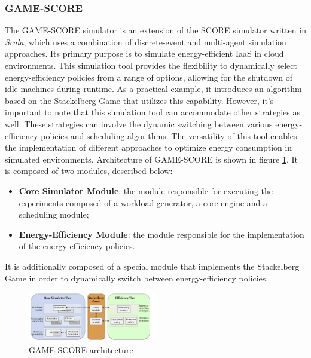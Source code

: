 {\subsubsection*{GAME-SCORE}
The GAME-SCORE simulator \cite{fernandez2019game} is an extension of the SCORE simulator written in \emph{Scala}, which uses a combination of discrete-event and multi-agent simulation approaches. Its primary purpose is to simulate energy-efficient IaaS in cloud environments. This simulation tool provides the flexibility to dynamically select energy-efficiency policies from a range of options, allowing for the shutdown of idle machines during runtime. As a practical example, it introduces an algorithm based on the Stackelberg Game that utilizes this capability. However, it's important to note that this simulation tool can accommodate other strategies as well. These strategies can involve the dynamic switching between various energy-efficiency policies and scheduling algorithms. The versatility of this tool enables the implementation of different approaches to optimize energy consumption in simulated environments.
Architecture of GAME-SCORE is shown in figure \ref{fig:gamescore_arch}. It is composed of two modules, described below:
\begin{itemize}
    \item \textbf{Core Simulator Module}: the module responsible for executing the experiments composed of a workload generator, a core engine and a scheduling module;
    \item \textbf{Energy-Efficiency Module}: the module responsible for the implementation of the energy-efficiency policies.
\end{itemize}
It is additionally composed of a special module that implements the Stackelberg Game in order to dynamically switch between energy-efficiency policies. 
\begin{figure}[h]
    \centering
    \includegraphics[width=0.5\textwidth]{chapters/images/gamescore_arch.png}
    \caption{GAME-SCORE architecture}
    \label{fig:gamescore_arch}
\end{figure}
}
